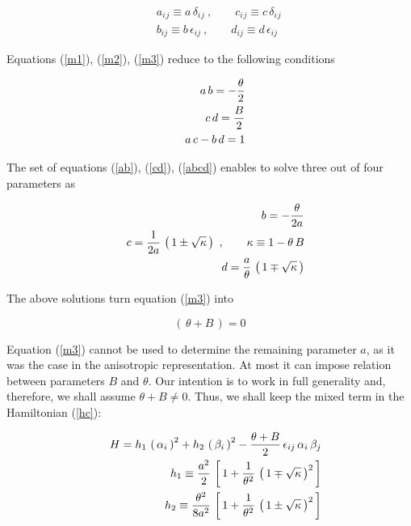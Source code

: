 \documentclass[a4paper,aps,prd,preprint]{revtex4}
\begin{document}
 \begin{eqnarray}
&& a_i{}_j\equiv a\,\delta_i{}_j \ ,\qquad c_i{}_j \equiv c\,  \delta_i{}_j\\
&& b_{ij}\equiv b\, \epsilon_{ij}\ ,\qquad d_{ij}\equiv d\, \epsilon_{ij}
\end{eqnarray}
 
 
 Equations (\ref{m1}), (\ref{m2}), (\ref{m3})  reduce to the following 
 conditions
 
 \begin{eqnarray}
 && a\, b = -{\theta\over 2} \label{ab} \\
 && c\, d = {B\over 2}\label{cd} \\
 && a\, c -b\, d = 1 \label{abcd}
 \end{eqnarray}
 
 The set of equations (\ref{ab}), (\ref{cd}), (\ref{abcd})
 enables to solve three out of four parameters as 
 
  \begin{eqnarray}
 && b=-{\theta\over 2a} \label{sol1}\\
 && c={1\over 2a}\,\left(\, 1\pm\sqrt\kappa\,\right)\ , \qquad
 \kappa\equiv 1-\theta\,B\label{sol2}\\
 && d={a\over \theta}\, \left(\, 1\mp\sqrt\kappa\,\right)\label{sol3}
 \end{eqnarray}
  
  The above solutions turn equation (\ref{m3}) into 
 
 \begin{equation}
 \left(\, \theta+B\,\right)=0\label{m33}
 \end{equation}
 
 Equation (\ref{m3})  cannot be used to determine the remaining parameter $a$, 
 as it was the case in the anisotropic representation. At most it can 
 impose relation between  parameters  $B$ and $\theta$. Our intention is to 
 work in full generality and, therefore, we shall assume $\theta + B\ne 0$.
 Thus, we shall keep the mixed term in the Hamiltonian (\ref{hc}):
 
 
 \begin{eqnarray}
 && H= h_1\, \left(\, \alpha_i\, \right)^2 + h_2\, \left(\, \beta_i\, \right)^2
 - {\theta + B\over 2}\, \epsilon_{ij}\, \alpha_i\,\beta_j 
 \label{sim}\\
 && h_1\equiv {a^2\over 2}\,\left[\, 1+{1\over \theta^2}\,\left(\, 1 
 \mp\sqrt\kappa\,\right)^2\,\right]\label{h1}\\
 && h_2\equiv {\theta^2\over 8a^2}\,\left[\, 1+{1\over \theta^2}\,
 \left(\, 1 \pm\sqrt\kappa\,\right)^2\,\right]\label{h2}
 \end{eqnarray}
 
\end{document}

